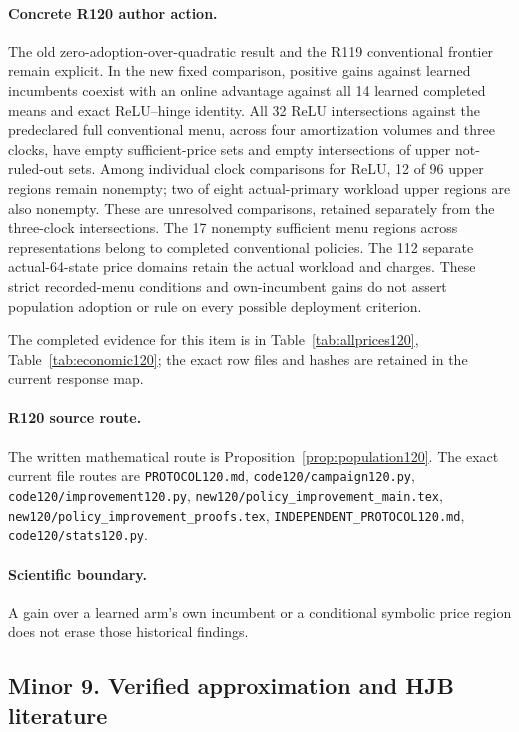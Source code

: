 \paragraph{Concrete R120 author action.}
The old zero-adoption-over-quadratic result and the R119 conventional frontier remain explicit. In the new fixed comparison, positive gains against learned incumbents coexist with an online advantage against all 14 learned completed means and exact ReLU--hinge identity. All 32 ReLU intersections against the predeclared full conventional menu, across four amortization volumes and three clocks, have empty sufficient-price sets and empty intersections of upper not-ruled-out sets. Among individual clock comparisons for ReLU, 12 of 96 upper regions remain nonempty; two of eight actual-primary workload upper regions are also nonempty. These are unresolved comparisons, retained separately from the three-clock intersections. The 17 nonempty sufficient menu regions across representations belong to completed conventional policies. The 112 separate actual-64-state price domains retain the actual workload and charges. These strict recorded-menu conditions and own-incumbent gains do not assert population adoption or rule on every possible deployment criterion.

The completed evidence for this item is in Table~\ref{tab:allprices120}, Table~\ref{tab:economic120}; the exact row files and hashes are retained in the current response map.
\paragraph{R120 source route.}
The written mathematical route is Proposition~\ref{prop:population120}. The exact current file routes are \nolinkurl{PROTOCOL120.md}, \nolinkurl{code120/campaign120.py}, \nolinkurl{code120/improvement120.py}, \nolinkurl{new120/policy_improvement_main.tex}, \nolinkurl{new120/policy_improvement_proofs.tex}, \nolinkurl{INDEPENDENT_PROTOCOL120.md}, \nolinkurl{code120/stats120.py}.
\paragraph{Scientific boundary.}
A gain over a learned arm's own incumbent or a conditional symbolic price region does not erase those historical findings.

\subsection{Minor 9. Verified approximation and HJB literature}
\label{response120:minor-9}
